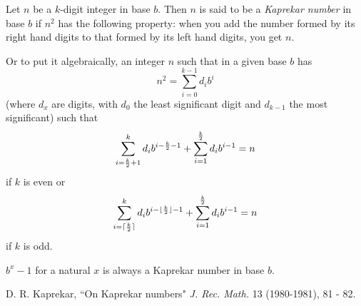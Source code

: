 \documentclass[12pt]{article}
\begin{document}
Let $n$ be a $k$-digit integer in base $b$. Then $n$ is said to be a {\em Kaprekar number} in base $b$ if $n^2$ has the following property: when you add the number formed by its right hand digits to that formed by its left hand digits, you get $n$.

Or to put it algebraically, an integer $n$ such that in a given base $b$ has $$n^2 = \sum_{i = 0}^{k - 1} d_ib^i$$ (where $d_x$ are digits, with $d_0$ the least significant digit and $d_{k - 1}$ the most significant) such that $$\sum_{i = {k \over 2} + 1}^k d_ib^{i - {k \over 2} - 1} + \sum_{i = 1}^{k \over 2} d_ib^{i - 1} = n$$ if $k$ is even or $$\sum_{i = \lceil {k \over 2} \rceil}^k d_ib^{i - \lfloor {k \over 2} \rfloor - 1} + \sum_{i = 1}^{k \over 2} d_ib^{i - 1} = n$$ if $k$ is odd.

$b^x - 1$ for a natural $x$ is always a Kaprekar number in base $b$.

\begin{thebibliography}{1}
 D. R. Kaprekar, ``On Kaprekar numbers" {\it J. Rec. Math.} 13 (1980-1981), 81 - 82.
\end{thebibliography}
\end{document}
